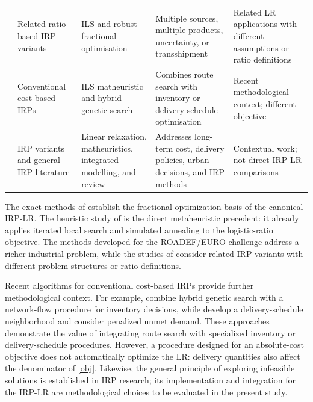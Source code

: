 \documentclass{article}
\begin{document}
\begin{table}[!htbp]
\begin{tabularx}{\textwidth}{
>{\raggedright\arraybackslash}p{2.15cm}
>{\raggedright\arraybackslash}p{2.55cm}
>{\raggedright\arraybackslash}p{2.75cm}
>{\raggedright\arraybackslash}X
>{\raggedright\arraybackslash}X}
\cite{alonsopecina2024iterated,man2025logistics}
&
Related ratio-based IRP variants
&
ILS and robust fractional optimisation
&
Multiple sources, multiple products, uncertainty, or transshipment
&
Related LR applications with different assumptions or ratio definitions
\\

\cite{lagana2024iterated,castro2026hybrid,zhao2025large}
&
Conventional cost-based IRPs
&
ILS matheuristic and hybrid genetic search
&
Combines route search with inventory or delivery-schedule optimisation
&
Recent methodological context; different objective
\\

\cite{chiu2024optimizing,dinh2025matheuristic,iswari2026extending,ekcsi2026inventory}
&
IRP variants and general IRP literature
&
Linear relaxation, matheuristics, integrated modelling, and review
&
Addresses long-term cost, delivery policies, urban decisions, and IRP methods
&
Contextual work; not direct IRP-LR comparisons
\\

\bottomrule
\end{tabularx}
\end{table}

The exact methods of \cite{archetti2017logistic,archetti2019exact}
establish the fractional-optimization basis of the canonical IRP-LR.
The heuristic study of \cite{alvarez2018iterated} is the direct
metaheuristic precedent: it already applies iterated local search and
simulated annealing to the logistic-ratio objective. The methods developed
for the ROADEF/EURO challenge address a richer industrial problem, while
the studies of \cite{alonsopecina2024iterated,man2025logistics} consider
related IRP variants with different problem structures or ratio
definitions.

Recent algorithms for conventional cost-based IRPs provide further
methodological context. For example, \cite{castro2026hybrid} combine
hybrid genetic search with a network-flow procedure for inventory
decisions, while \cite{zhao2025large} develop a delivery-schedule
neighborhood and consider penalized unmet demand. These approaches
demonstrate the value of integrating route search with specialized
inventory or delivery-schedule procedures. However, a procedure designed
for an absolute-cost objective does not automatically optimize the LR:
delivery quantities also affect the denominator of \eqref{obj}. Likewise,
the general principle of exploring infeasible solutions is established in
IRP research; its implementation and integration for the IRP-LR are
methodological choices to be evaluated in the present study.
\end{document}
